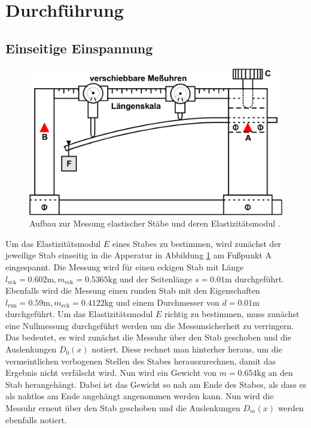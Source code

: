 \section{Durchführung}
\label{sec:Durchführung}

\subsection{Einseitige Einspannung}
\label{sec:EinsetigeEinspannung}

\begin{figure} %
    \centering
    \includegraphics[width=\textwidth]{pictures/EinspannungEineSeite.png}
    \caption{Aufbau zur Messung elastischer Stäbe und deren Elastizitätsmodul \cite{v103}.}
    \label{fig:EinsetigeEinspannung}
\end{figure}

Um das Elastizitätsmodul $E$ eines Stabes zu bestimmen, wird zunächst der jeweilige Stab einseitig in die Apperatur
in Abbildung \ref{fig:EinsetigeEinspannung} am Fußpunkt A eingespannt.
Die Messung wird für einen eckigen Stab mit Länge $l_\text{eck} = 0.602 \unit\meter , m_\text{eck} = 0.5365 \unit{\kilo\gram}$
und der Seitenlänge $s = 0.01 \unit\meter$ durchgeführt.
Ebenfalls wird die Messung einen runden Stab mit den Eigenschaften $l_\text{run} = 0.59 \unit\meter , m_\text{eck} = 0.4122 \unit{\kilo\gram}$
und einem Durchmesser von $d = 0.01 \unit\meter$ durchgeführt.
Um das Elastizitätsmodul $E$ richtig zu bestimmen, muss zunächst eine Nullmessung durchgeführt werden um die Messunsicherheit zu verringern.
Das bedeutet, es wird zunächst die Messuhr über den Stab geschoben und die Auslenkungen $D_0 (x)$ notiert.
Diese rechnet man hinterher heraus, um die vermeintlichen verbogenen Stellen des Stabes herauszurechnen, damit das Ergebnis nicht verfälscht wird.
Nun wird ein Gewicht von $m = 0.654 \unit{\kilo\gram}$ an den Stab herangehängt.
Dabei ist das Gewicht so nah am Ende des Stabes, als dass es als nahtlos am Ende angehängt angenommen werden kann.
Nun wird die Messuhr erneut über den Stab geschoben und die Auslenkungen $D_m (x)$ werden ebenfalls notiert.

